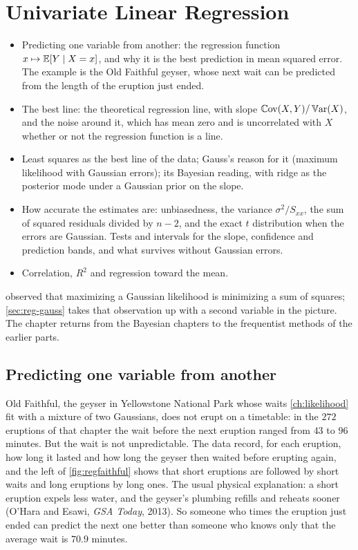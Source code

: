 \chapter{Univariate Linear Regression}
\label{ch:regression-uni}

\begin{chaptergoals}
\begin{itemize}[nosep]
\item Predicting one variable from another: the regression function $x \mapsto \operatorname*{\mathbb{E}}[Y \mid X = x]$, and why it is the best prediction in mean squared error. The example is the Old Faithful geyser, whose next wait can be predicted from the length of the eruption just ended.
\item The best line: the theoretical regression line, with slope $\operatorname*{\mathbb{C}\text{ov}}(X, Y)/\operatorname*{\mathbb{V}\text{ar}}(X)$, and the noise around it, which has mean zero and is uncorrelated with $X$ whether or not the regression function is a line.
\item Least squares as the best line of the data; Gauss's reason for it (maximum likelihood with Gaussian errors); its Bayesian reading, with ridge as the posterior mode under a Gaussian prior on the slope.
\item How accurate the estimates are: unbiasedness, the variance $\sigma^2/S_{xx}$, the sum of squared residuals divided by $n - 2$, and the exact $t$ distribution when the errors are Gaussian. Tests and intervals for the slope, confidence and prediction bands, and what survives without Gaussian errors.
\item Correlation, $R^2$ and regression toward the mean.
\end{itemize}
 observed that maximizing a Gaussian likelihood is minimizing a sum of squares; \cref{sec:reg-gauss} takes that observation up with a second variable in the picture. The chapter returns from the Bayesian chapters to the frequentist methods of the earlier parts.
\end{chaptergoals}

\section{Predicting one variable from another}
\label{sec:reg-predict}

Old Faithful, the geyser in Yellowstone National Park whose waits \cref{ch:likelihood} fit with a mixture of two Gaussians, does not erupt on a timetable: in the $272$ eruptions of that chapter the wait before the next eruption ranged from $43$ to $96$ minutes.
But the wait is not unpredictable.
The data record, for each eruption, how long it lasted and how long the geyser then waited before erupting again, and the left of \cref{fig:regfaithful} shows that short eruptions are followed by short waits and long eruptions by long ones.
The usual physical explanation: a short eruption expels less water, and the geyser's plumbing refills and reheats sooner (O'Hara and Esawi, \textit{GSA Today}, 2013).
So someone who times the eruption just ended can predict the next one better than someone who knows only that the average wait is $70.9$ minutes.

